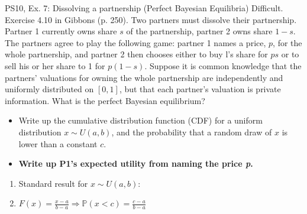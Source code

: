 \begin{frame}{PS10, Ex. 7: Dissolving a partnership (Perfect Bayesian Equilibria)}
    Difficult. Exercise 4.10 in Gibbons (p. 250). Two partners must dissolve their partnership. Partner 1 currently owns share $s$ of the partnership, partner 2 owns share $1-s$. The partners agree to play the following game: partner 1 names a price, $p$, for the whole partnership, and partner 2 then chooses either to buy l's share for $ps$ or to sell his or her share to 1 for $p(1-s)$. Suppose it is common knowledge that the partners' valuations for owning the whole partnership are independently and uniformly distributed on $[0,1]$, but that each partner's valuation is private information. What is the perfect Bayesian equilibrium?\vspace{-8pt}
    \begin{multicols}{2}
      \begin{itemize}
        \item[Step 1:] Write up the cumulative distribution function (CDF) for a uniform distribution $x\sim U(a, b)$, and the probability that a random draw of $x$ is lower than a constant $c$.
        \item[Step 2:] \textbf{Write up P1's expected utility from naming the price \textit{p}.}
      \end{itemize}
      \vfill\null\columnbreak
      \begin{enumerate}
        \item Standard result for $x\sim U(a, b):$
        \item[CDF:] $F(x)=\frac{x-a}{b-a}\Rightarrow\mathbb{P}(x<c)=\frac{c-a}{b-a}$
      \end{enumerate}
      \vfill\null
    \end{multicols}
\end{frame}
